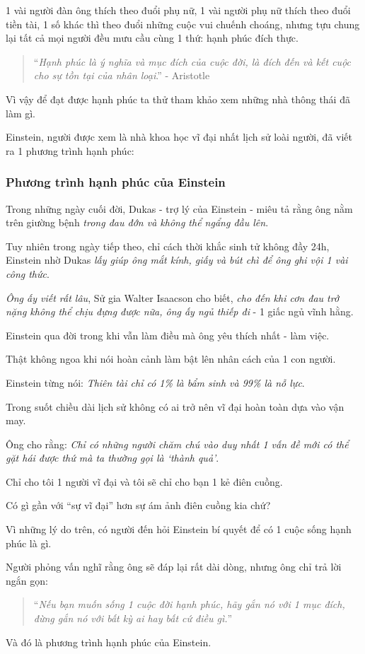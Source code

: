 \documentclass{article}
\begin{document}
1 vài người đàn ông thích theo đuổi phụ nữ, 1 vài người phụ nữ thích theo đuổi tiền tài, 1 số khác thì theo đuổi những cuộc vui chuếnh choáng, nhưng tựu chung lại tất cả mọi người đều mưu cầu cùng 1 thứ: hạnh phúc đích thực.
\begin{quotation}
	``\textit{Hạnh phúc là ý nghĩa và mục đích của cuộc đời, là đích đến và kết cuộc cho sự tồn tại của nhân loại}.'' - Aristotle
\end{quotation}
Vì vậy để đạt được hạnh phúc ta thử tham khảo xem những nhà thông thái đã làm gì.

Einstein, người được xem là nhà khoa học vĩ đại nhất lịch sử loài người, đã viết ra 1 phương trình hạnh phúc:

\subsubsection{Phương trình hạnh phúc của Einstein}
Trong những ngày cuối đời, Dukas - trợ lý của Einstein - miêu tả rằng ông nằm trên giường bệnh \textit{trong đau đớn và không thể ngẩng đầu lên}.

%
Tuy nhiên trong ngày tiếp theo, chỉ cách thời khắc sinh tử không đầy 24h, Einstein nhờ Dukas \textit{lấy giúp ông mắt kính, giấy và bút chì để ông ghi vội 1 vài công thức}.

%
\textit{Ông ấy viết rất lâu}, Sử gia Walter Isaacson cho biết, \textit{cho đến khi cơn đau trở nặng không thể chịu đựng được nữa, ông ấy ngủ thiếp đi} - 1 giấc ngủ vĩnh hằng.

Einstein qua đời trong khi vẫn làm điều mà ông yêu thích nhất - làm việc.

Thật không ngoa khi nói hoàn cảnh làm bật lên nhân cách của 1 con người.

%
Einstein từng nói: \textit{Thiên tài chỉ có 1\% là bẩm sinh và 99\% là nỗ lực}.

Trong suốt chiều dài lịch sử không có ai trở nên vĩ đại hoàn toàn dựa vào vận may.

Ông cho rằng: \textit{Chỉ có những người chăm chú vào duy nhất 1 vấn đề mới có thể gặt hái được thứ mà ta thường gọi là `thành quả'}.

%
Chỉ cho tôi 1 người vĩ đại và tôi sẽ chỉ cho bạn 1 kẻ điên cuồng.

Có gì gần với ``sự vĩ đại'' hơn sự ám ảnh điên cuồng kia chứ?

%
Vì những lý do trên, có người đến hỏi Einstein bí quyết để có 1 cuộc sống hạnh phúc là gì.

Người phỏng vấn nghĩ rằng ông sẽ đáp lại rất dài dòng, nhưng ông chỉ trả lời ngắn gọn:
\begin{quotation}
	``\textit{Nếu bạn muốn sống 1 cuộc đời hạnh phúc, hãy gắn nó với 1 mục đích, đừng gắn nó với bất kỳ ai hay bất cứ điều gì.}''
\end{quotation}
Và đó là phương trình hạnh phúc của Einstein.
\end{document}
